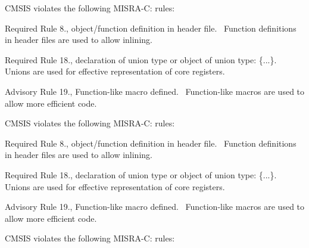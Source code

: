 CMSIS violates the following MISRA-\/C: rules:\+

\begin{DoxyItemize}
\item Required Rule 8., object/\+function definition in header file.~\newline
 Function definitions in header files are used to allow \textquotesingle{}inlining\textquotesingle{}.\end{DoxyItemize}
\begin{DoxyItemize}
\item Required Rule 18., declaration of union type or object of union type:\+ \textquotesingle{}\{...\}\textquotesingle{}.~\newline
 Unions are used for effective representation of core registers.\end{DoxyItemize}
\begin{DoxyItemize}
\item Advisory Rule 19., Function-\/like macro defined.~\newline
 Function-\/like macros are used to allow more efficient code.\end{DoxyItemize}


CMSIS violates the following MISRA-\/C: rules:\+

\begin{DoxyItemize}
\item Required Rule 8., object/\+function definition in header file.~\newline
 Function definitions in header files are used to allow \textquotesingle{}inlining\textquotesingle{}.\end{DoxyItemize}
\begin{DoxyItemize}
\item Required Rule 18., declaration of union type or object of union type:\+ \textquotesingle{}\{...\}\textquotesingle{}.~\newline
 Unions are used for effective representation of core registers.\end{DoxyItemize}
\begin{DoxyItemize}
\item Advisory Rule 19., Function-\/like macro defined.~\newline
 Function-\/like macros are used to allow more efficient code.\end{DoxyItemize}


CMSIS violates the following MISRA-\/C: rules:\+

